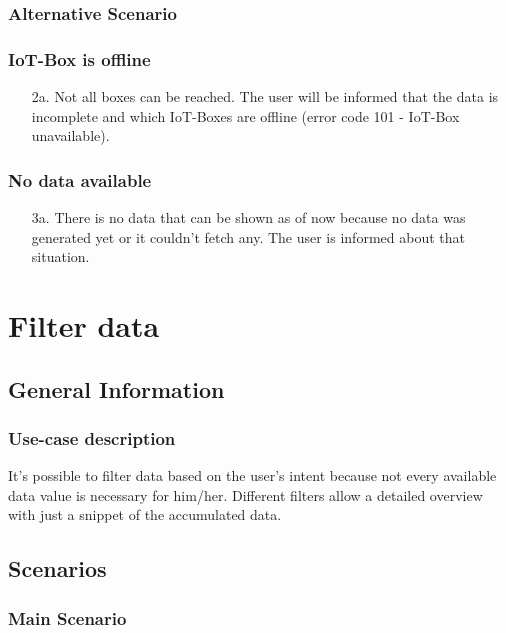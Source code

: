 \documentclass[notitlepage]{article}
\begin{document}
\subsubsection{Alternative Scenario}
\subsubsection*{IoT-Box is offline}
\begin{enumerate}
	\item[2a.]{Not all boxes can be reached. The user will be informed that the data is incomplete and which IoT-Boxes are offline (error code 101 - IoT-Box unavailable).}
	      
\end{enumerate}


\subsubsection*{No data available}
\begin{enumerate}
	\item[3a.]{There is no data that can be shown as of now because no data was generated yet or it couldn't fetch any. The user is informed about that situation.}
	      
\end{enumerate}

\section{Filter data}

\subsection{General Information}
\subsubsection{Use-case description}
It's possible to filter data based on the user's intent because not every available data value is necessary for him/her. Different filters allow a detailed overview with just a snippet of the accumulated data.

\subsection{Scenarios}

\subsubsection{Main Scenario}
\end{document}
